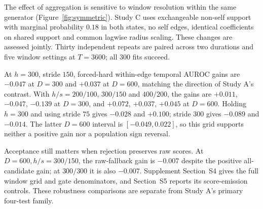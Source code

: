 The effect of aggregation is sensitive to window resolution within the
same generator (Figure~\ref{fig:symmetric}). Study C uses exchangeable
non-self support with marginal probability $0.18$ in both states, no self
edges, identical coefficients on shared support and common lagwise radius
scaling. These changes are assessed jointly. Thirty independent repeats are
paired across two durations and five window settings at $T=3600$; all 300
fits succeed.

At $h=300$, stride $150$, forced-hard within-edge temporal AUROC gains are
$-0.047$ at $D=300$ and $+0.037$ at $D=600$, matching the direction
of Study A's contrast. With $h/s=200/100$, $300/150$ and $400/200$,
the gains are $+0.011$, $-0.047$, $-0.139$ at $D=300$, and
$+0.072$, $+0.037$, $+0.045$ at $D=600$. Holding $h=300$ and using
stride $75$ gives $-0.028$ and $+0.100$; stride $300$ gives $-0.089$
and $-0.014$. The latter $D=600$ interval is $[-0.049,0.022]$, so this
grid supports neither a positive gain nor a population sign reversal.

Acceptance still matters when rejection preserves raw scores. At
$D=600,h/s=300/150$, the raw-fallback gain is $-0.007$ despite the
positive all-candidate gain; at $300/300$ it is also $-0.007$.
Supplement Section~S4 gives the full window grid and gate denominators,
and Section~S5 reports its score-emission controls. These robustness
comparisons are separate from Study A's primary four-test family.
